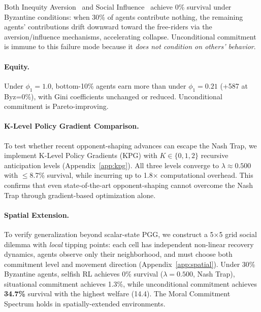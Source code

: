 \documentclass{article}
\begin{document}
\noindent Both Inequity Aversion~\citep{hughes2018inequity} and Social Influence~\citep{jaques2019social} achieve 0\% survival under Byzantine conditions: when 30\% of agents contribute nothing, the remaining agents' contributions drift downward toward the free-riders via the aversion/influence mechanisms, accelerating collapse.
Unconditional commitment is immune to this failure mode because it \emph{does not condition on others' behavior}.

\paragraph{Equity.}
Under $\phi_1 = 1.0$, bottom-10\% agents earn more than under $\phi_1 = 0.21$ (+587 at Byz=0\%), with Gini coefficients unchanged or reduced.
Unconditional commitment is Pareto-improving.

\paragraph{K-Level Policy Gradient Comparison.}
To test whether recent opponent-shaping advances can escape the Nash Trap, we implement K-Level Policy Gradients (KPG) with $K \in \{0, 1, 2\}$ recursive anticipation levels (Appendix~\ref{app:kpg}).
All three levels converge to $\lambda \approx 0.500$ with $\leq$8.7\% survival, while incurring up to 1.8$\times$ computational overhead.
This confirms that even state-of-the-art opponent-shaping cannot overcome the Nash Trap through gradient-based optimization alone.

\paragraph{Spatial Extension.}
To verify generalization beyond scalar-state PGG, we construct a 5$\times$5 grid social dilemma with \emph{local} tipping points: each cell has independent non-linear recovery dynamics, agents observe only their neighborhood, and must choose both commitment level and movement direction (Appendix~\ref{app:spatial}).
Under 30\% Byzantine agents, selfish RL achieves 0\% survival ($\lambda = 0.500$, Nash Trap), situational commitment achieves 1.3\%, while unconditional commitment achieves \textbf{34.7\%} survival with the highest welfare (14.4).
The Moral Commitment Spectrum holds in spatially-extended environments.

\end{document}
